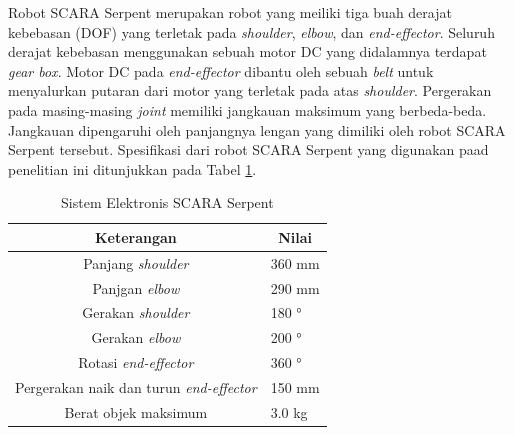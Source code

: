 Robot SCARA Serpent merupakan robot yang meiliki tiga buah derajat kebebasan (DOF) yang terletak pada \textit{shoulder}, \textit{elbow}, dan \textit{end-effector}. Seluruh derajat kebebasan menggunakan sebuah motor DC yang didalamnya terdapat\textit{ gear box}. Motor DC pada \textit{end-effector} dibantu oleh sebuah \textit{belt} untuk menyalurkan putaran dari motor yang terletak pada atas \textit{shoulder}. Pergerakan pada masing-masing \textit{joint} memiliki jangkauan maksimum yang berbeda-beda. Jangkauan dipengaruhi oleh panjangnya lengan yang dimiliki oleh robot SCARA Serpent tersebut\cite{bulet}. Spesifikasi dari robot SCARA Serpent yang digunakan paad penelitian ini ditunjukkan pada Tabel \ref{tbl.elektronisSCARA}. 

\begin{longtable}{|c|l|}
	\caption{Sistem Elektronis SCARA Serpent}
	\label{tbl.elektronisSCARA}\\
	\hline
	\rowcolor[HTML]{9B9B9B} 
	Keterangan & \multicolumn{1}{c|}{\cellcolor[HTML]{9B9B9B}Nilai} \\ \hline
	\endfirsthead
	\endhead
	Panjang \textit{shoulder} & 360 mm                                             \\ \hline
	Panjgan \textit{elbow}  & 290 mm                                                    \\ \hline
	Gerakan \textit{shoulder}  &180 °                                  \\ \hline
	Gerakan \textit{elbow}  & 200 °                                  \\ \hline
	Rotasi \textit{end-effector}  & 360 °                                   \\ \hline
	Pergerakan naik dan turun \textit{end-effector}  &  150 mm                            \\ \hline
	Berat objek maksimum  &  3.0 kg                                                 \\ \hline
	
\end{longtable}

